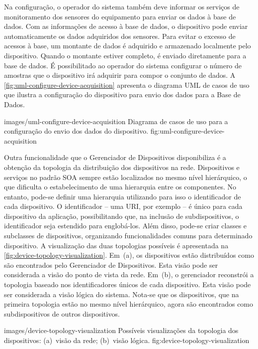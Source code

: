 Na configuração, o operador do sistema também deve informar os serviços de monitoramento dos
sensores do equipamento para enviar os dados à base de dados. Com as informações de acesso à base de
dados, o dispositivo pode enviar automaticamente os dados adquiridos dos sensores. Para evitar o
excesso de acessos à base, um montante de dados é adquirido e armazenado localmente pelo
dispositivo. Quando o montante estiver completo, é enviado diretamente para a base de dados. É
possibilitado ao operador do sistema configurar o número de amostras que o dispositivo irá adquirir
para compor o conjunto de dados. A \cref{fig:uml-configure-device-acquisition} apresenta o diagrama
\gls{UML} de casos de uso que ilustra a configuração do dispositivo para envio dos dados para a Base
de Dados.

  {images/uml-configure-device-acquisition}
  {Diagrama de casos de uso para a configuração do envio dos dados do dispositivo.}
  {fig:uml-configure-device-acquisition}

Outra funcionalidade que o Gerenciador de Dispositivos disponibiliza é a obtenção da topologia da
distribuição dos dispositivos na rede. Dispositivos e serviços no padrão \gls{SOA} sempre estão
localizados no mesmo nível hierárquico, o que dificulta o estabelecimento de uma hierarquia entre os
componentes. No entanto, pode-se definir uma hierarquia utilizando para isso o identificador de cada
dispositivo. O identificador -- uma \gls{URI}, por exemplo -- é único para cada dispositivo da
aplicação, possibilitando que, na inclusão de subdispositivos, o identificador seja estendido para
englobá-los. Além disso, pode-se criar classes e subclasses de dispositivos, organizando
funcionalidades comuns para determinado dispositivo. A visualização das duas topologias possíveis é
apresentada na \cref{fig:device-topology-visualization}. Em~(a), os dispositivos estão distribuídos
como são encontrados pelo Gerenciador de Dispositivos. Esta visão pode ser considerada a visão do
ponto de vista da rede. Em~(b), o gerenciador reconstrói a topologia baseado nos identificadores
únicos de cada dispositivo. Esta visão pode ser considerada a visão lógica do sistema. Nota-se que
os dispositivos, que na primeira topologia estão no mesmo nível hierárquico, agora são encontrados
como subdispositivos de outros dispositivos.

  {images/device-topology-visualization}
  {Possíveis visualizações da topologia dos dispositivos: (a)~visão da rede; (b)~visão lógica.}
  {fig:device-topology-visualization}


